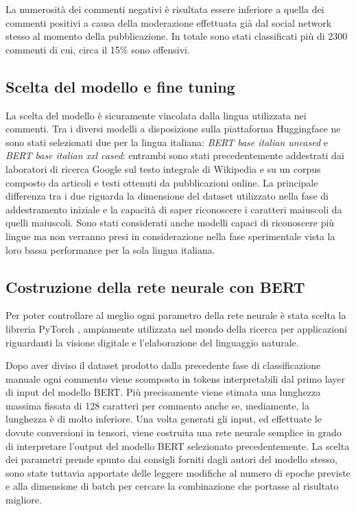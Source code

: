    La numerosità dei commenti negativi è risultata essere inferiore a quella dei commenti positivi a causa della moderazione effettuata già dal social network stesso al momento della pubblicazione. In totale sono stati classificati più di 2300 commenti di cui, circa il 15\% sono offensivi.

\subsection{Scelta del modello e fine tuning}
    La scelta del modello è sicuramente vincolata dalla lingua utilizzata nei commenti. Tra i diversi modelli a disposizione sulla piattaforma Huggingface \cite{huggingface} ne sono stati selezionati due per la lingua italiana: \textit{BERT base italian uncased} e \textit{BERT base italian xxl cased}: entrambi sono stati precedentemente addestrati dai laboratori di ricerca Google sul testo integrale di Wikipedia e su un corpus composto da articoli e testi ottenuti da pubblicazioni online. La principale differenza tra i due riguarda la dimensione del dataset utilizzato nella fase di addestramento iniziale e la capacità di saper riconoscere i caratteri maiuscoli da quelli maiuscoli. Sono stati considerati anche modelli capaci di riconoscere più lingue ma non verranno presi in considerazione nella fase sperimentale vista la loro bassa performance per la sola lingua italiana.
    
    
\subsection{Costruzione della rete neurale con BERT}
    Per poter controllare al meglio ogni parametro della rete neurale è stata scelta la libreria PyTorch \cite{pytorch}, ampiamente utilizzata nel mondo della ricerca per applicazioni riguardanti la visione digitale e l'elaborazione del linguaggio naturale.
    
    Dopo aver diviso il dataset prodotto dalla precedente fase di classificazione manuale ogni commento viene scomposto in tokens interpretabili dal primo layer di input del modello BERT. Più precisamente viene stimata una lunghezza massima fissata di 128 caratteri per commento anche se, mediamente, la lunghezza è di molto inferiore. Una volta generati gli input, ed effettuate le dovute conversioni in tensori, viene costruita una rete neurale semplice in grado di interpretare l'output del modello BERT selezionato precedentemente. La scelta dei parametri prende spunto dai consigli forniti dagli autori del modello stesso, sono state tuttavia apportate delle leggere modifiche al numero di epoche previste e alla dimensione di batch per cercare la combinazione che portasse al risultato migliore.
    
